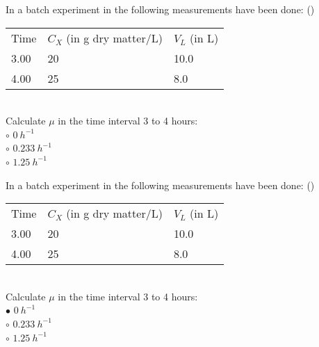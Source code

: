\documentclass[]{beamer}
\begin{document}
\begin{frame}[shrink] {}
\color{blue}
In a batch experiment in the following measurements have been done:
({\color{red}{Q8}})\\
\color{gray}
\begin{tabular}[ ]{l l l}
Time & $C_{X}$ (in g dry matter/L) & $V_{L}$ (in L)  \\
3.00 & 20 & 10.0  \\
4.00 & 25 & 8.0  \\
\end{tabular}  \\
\color{blue}
Calculate $\mu$ in the time interval 3 to 4 hours:
\\
\color{black}
\setlength{\parindent}{-0.4cm}
{\color{red}$\circ$} $0 ~h^{-1}$  \\
{\color{red}$\circ$} $0.233 ~h^{-1}$  \\
{\color{red}$\circ$} $1.25 ~h^{-1}$  \\
\end{frame}
\begin{frame}[shrink] {}
\color{blue}
In a batch experiment in the following measurements have been done:
({\color{green}{Q8}})\\
\color{gray}
\begin{tabular}[ ]{l l l}
Time & $C_{X}$ (in g dry matter/L) & $V_{L}$ (in L)  \\
3.00 & 20 & 10.0  \\
4.00 & 25 & 8.0  \\
\end{tabular}  \\
\color{blue}
Calculate $\mu$ in the time interval 3 to 4 hours:
\\
\color{black}
\setlength{\parindent}{-0.4cm}
{\color{red}$\bullet$} $0 ~h^{-1}$  \\
{\color{red}$\circ$} $0.233 ~h^{-1}$  \\
{\color{red}$\circ$} $1.25 ~h^{-1}$  \\
\end{frame}
\end{document}
